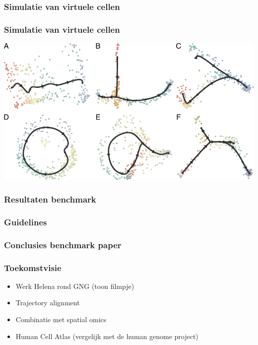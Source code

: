 \documentclass{beamer}
\begin{document}
\begin{frame}
	\frametitle{Simulatie van virtuele cellen}
	\begin{center}
	\end{center}
\end{frame}

\begin{frame}
	\frametitle{Simulatie van virtuele cellen}
	\begin{center}
		\includegraphics[width=\linewidth]{figures/7_dyngen/example_runs.pdf}
	\end{center}
\end{frame}

\begin{frame}
	\frametitle{Resultaten benchmark}
\end{frame}

\begin{frame}
	\frametitle{Guidelines}
\end{frame}

\begin{frame}
	\frametitle{Conclusies benchmark paper}
\end{frame}

\begin{frame}
	\frametitle{Toekomstvisie}
	\begin{itemize}
		\item Werk Helena rond GNG (toon filmpje)
		\item Trajectory alignment
		\item Combinatie met spatial omics
		\item Human Cell Atlas (vergelijk met de human genome project)
	\end{itemize}
\end{frame}
\end{document}
